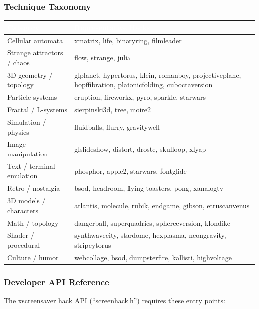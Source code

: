 \documentclass[11pt,letterpaper]{article}
\newcommand{\tableheader}[1]{\textbf{\sffamily\textcolor{white}{#1}}}
\begin{document}
\subsubsection{Technique Taxonomy}

\begin{center}
\begin{tabularx}{\textwidth}{L{3.5cm}X}
\toprule
{}
\tableheader{Category} & \tableheader{Representative Hacks} \\
\midrule
Cellular automata & xmatrix, life, binaryring, filmleader \\
Strange attractors / chaos & flow, strange, julia \\
3D geometry / topology & glplanet, hypertorus, klein, romanboy, projectiveplane, hopffibration, platonicfolding, cuboctaversion \\
Particle systems & eruption, fireworkx, pyro, sparkle, starwars \\
Fractal / L-systems & sierpinski3d, tree, moire2 \\
Simulation / physics & fluidballs, flurry, gravitywell \\
Image manipulation & glslideshow, distort, droste, skulloop, xlyap \\
Text / terminal emulation & phosphor, apple2, starwars, fontglide \\
Retro / nostalgia & bsod, headroom, flying-toasters, pong, xanalogtv \\
3D models / characters & atlantis, molecule, rubik, endgame, gibson, etruscanvenus \\
Math / topology & dangerball, superquadrics, sphereeversion, klondike \\
Shader / procedural & synthwavecity, stardome, hexplasma, neongravity, stripeytorus \\
Culture / humor & webcollage, bsod, dumpsterfire, kallisti, highvoltage \\
\bottomrule
\end{tabularx}
\end{center}

\subsubsection{Developer API Reference}

The xscreensaver hack API (``screenhack.h'') requires these entry points:
\end{document}
